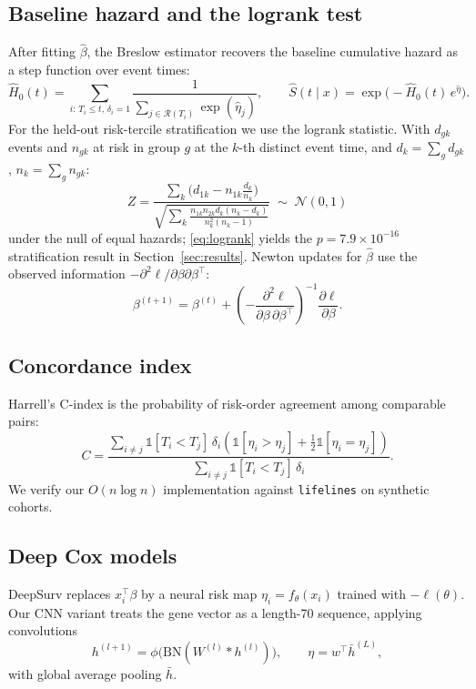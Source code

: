 \documentclass[12pt,a4paper]{article}
\begin{document}
\subsection{Baseline hazard and the logrank test}
After fitting $\hat\beta$, the Breslow estimator recovers the baseline
cumulative hazard as a step function over event times:
\begin{equation}
  \hat{H}_0(t) = \sum_{i:\, T_i \le t,\, \delta_i = 1}
  \frac{1}{\sum_{j \in \mathcal{R}(T_i)} \exp(\hat\eta_j)} ,
  \qquad \hat{S}(t \mid x) = \exp\!\big(-\hat{H}_0(t)\, e^{\hat\eta}\big) .
  \label{eq:breslow}
\end{equation}
For the held-out risk-tercile stratification we use the logrank statistic.
With $d_{g k}$ events and $n_{g k}$ at risk in group $g$ at the $k$-th
distinct event time, and $d_k = \sum_g d_{g k}$, $n_k = \sum_g n_{g k}$:
\begin{equation}
  Z = \frac{\sum_k \big( d_{1k} - n_{1k} \tfrac{d_k}{n_k} \big)}
  {\sqrt{\sum_k \frac{n_{1k} n_{2k} d_k (n_k - d_k)}{n_k^2 (n_k - 1)}}}
  \;\sim\; \mathcal{N}(0,1) \label{eq:logrank}
\end{equation}
under the null of equal hazards; \eqref{eq:logrank} yields the
$p = 7.9\times 10^{-16}$ stratification result in
Section~\ref{sec:results}. Newton updates for $\hat\beta$ use the observed
information $-\partial^2 \ell / \partial \beta \partial \beta^\top$:
\begin{equation}
  \beta^{(t+1)} = \beta^{(t)} + \left( -\frac{\partial^2 \ell}{\partial \beta\, \partial \beta^\top} \right)^{-1} \frac{\partial \ell}{\partial \beta} . \label{eq:newton}
\end{equation}
\subsection{Concordance index}
Harrell's C-index is the probability of risk-order agreement among comparable
pairs:
\begin{equation}
  C = \frac{\sum_{i \ne j} \mathbb{1}[T_i < T_j]\, \delta_i
    \left( \mathbb{1}[\eta_i > \eta_j] + \tfrac{1}{2}\mathbb{1}[\eta_i = \eta_j] \right)}
  {\sum_{i \ne j} \mathbb{1}[T_i < T_j]\, \delta_i } . \label{eq:cindex}
\end{equation}
We verify our $O(n \log n)$ implementation against \texttt{lifelines} on
synthetic cohorts.
\subsection{Deep Cox models}
DeepSurv replaces $x_i^\top\beta$ by a neural risk map
$\eta_i = f_\theta(x_i)$ trained with $-\ell(\theta)$. Our CNN variant treats
the gene vector as a length-70 sequence, applying convolutions
\begin{equation}
  h^{(l+1)} = \phi\big( \mathrm{BN}( W^{(l)} * h^{(l)} ) \big), \qquad
  \eta = w^\top \bar{h}^{(L)} ,
\end{equation}
with global average pooling $\bar{h}$.
\end{document}
